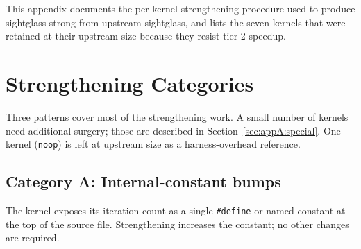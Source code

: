 
\label{ch:appendix-strong}

This appendix documents the per-kernel strengthening procedure used to produce sightglass-strong from upstream sightglass, and lists the seven kernels that were retained at their upstream size because they resist tier-2 speedup.

\section{Strengthening Categories}
\label{sec:appA:categories}

Three patterns cover most of the strengthening work. A small number of kernels need additional surgery; those are described in Section~\ref{sec:appA:special}. One kernel (\texttt{noop}) is left at upstream size as a harness-overhead reference.

\subsection{Category A: Internal-constant bumps}

The kernel exposes its iteration count as a single \texttt{\#define} or named constant at the top of the source file. Strengthening increases the constant; no other changes are required.

